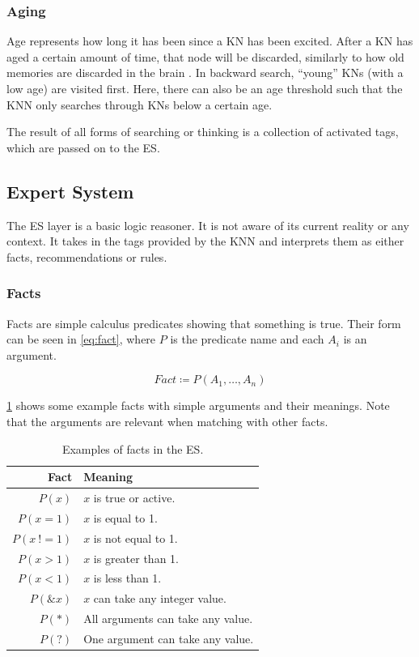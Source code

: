 \documentclass[titlepage,11pt]{article}
\begin{document}
\subsubsection{Aging}

Age represents how long it has been since a KN has been excited. After a KN has aged a certain amount of time, that node will be discarded, similarly to how old memories are discarded in the brain \cite{aging}. In backward search, ``young'' KNs (with a low age) are visited first. Here, there can also be an age threshold such that the KNN only searches through KNs below a certain age.

The result of all forms of searching or thinking is a collection of activated tags, which are passed on to the ES.

\subsection{Expert System} \label{sec:background_expert_system}

The ES layer is a basic logic reasoner. It is not aware of its current reality or any context. It takes in the tags provided by the KNN and interprets them as either facts, recommendations or rules.

\subsubsection{Facts}
Facts are simple calculus predicates showing that something is true. Their form can be seen in \cref{eq:fact}, where $P$ is the predicate name and each $A_i$ is an argument.

\begin{equation} \label{eq:fact}
	Fact \coloneqq P(A_1, \ldots, A_n)
\end{equation}

\cref{table:fact_predicates} shows some example facts with simple arguments and their meanings. Note that the arguments are relevant when matching with other facts.

\begin{table}[!htb]
	\centering
	\caption{Examples of facts in the ES.}
	\begin{tabular}{r | l}
		\textbf{Fact} & \textbf{Meaning} \\ \hline
		$P(x)$ & $x$ is true or active.\\
		$P(x = 1)$ & $x$ is equal to 1. \\
		$P(x \ != 1)$ & $x$ is not equal to 1. \\
		$P(x > 1)$ & $x$ is greater than 1. \\
		$P(x < 1)$ & $x$ is less than 1. \\
		$P(\&x)$ & $x$ can take any integer value. \\
		$P(*)$ & All arguments can take any value. \\
		$P(?)$ & One argument can take any value. \\
	\end{tabular}
	\label{table:fact_predicates}
\end{table}
\end{document}
